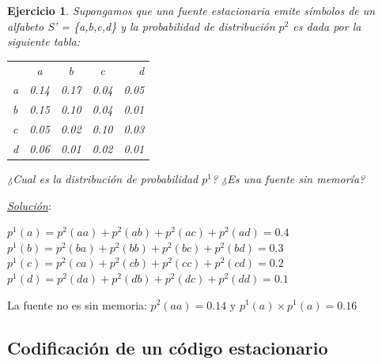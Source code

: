 \documentclass{beamer}
\theoremstyle{plain}
\theoremstyle{example}
\newtheorem{ejercicio} [Ejercicio]{Ejercicio}
\theoremstyle{example}
\begin{document}

\begin{frame}  \footnotesize

\begin{ejercicio}

Supongamos que una fuente estacionaria emite símbolos de un alfabeto S' = \{a,b,c,d\} y la probabilidad de distribución $p^2$ es dada por la siguiente tabla: 

\begin{center}
 \begin{tabular}{ l c c c r }
         & a & b & c & d\\
   a & 0.14 & 0.17 & 0.04 & 0.05\\
   b & 0.15 & 0.10 & 0.04 & 0.01 \\
   c & 0.05 & 0.02 & 0.10 & 0.03 \\
   d & 0.06 & 0.01 & 0.02 & 0.01 \\
 \end{tabular}
\end{center}

 ¿Cual es la distribución de probabilidad $p^1$? ¿Es una fuente sin memoría?\\
\end{ejercicio}

\pause
\textit{\underline{Solución}}:\\

\begin{center}
$p^1(a) = p^2(aa)+p^2(ab)+p^2(ac) +p^2(ad)  = 0.4$\\
$p^1(b) = p^2(ba)+p^2(bb)+p^2(bc) +p^2(bd) = 0.3$\\
$p^1(c) = p^2(ca)+p^2(cb)+p^2(cc) +p^2(cd)= 0.2$\\
$p^1(d) = p^2(da)+p^2(db)+p^2(dc) +p^2(dd) = 0.1$\\
\end{center}

La fuente no es sin memoria:  $p^2(aa)=0.14$ y  $p^1(a) \times p^1(a)=0.16$

\end{frame} 

\subsection{Codificación de un código estacionario}
\end{document}
